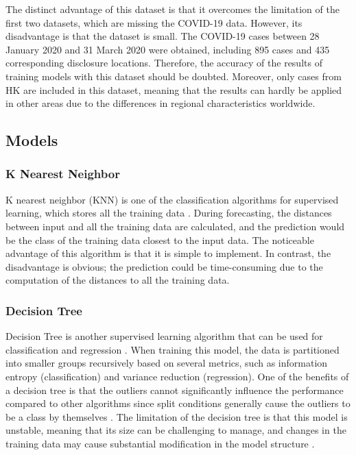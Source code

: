 \documentclass[12pt,twoside]{report}
\begin{document}
The distinct advantage of this dataset is that it overcomes the limitation of the first two datasets, which are missing the COVID-19 data. However, its disadvantage is that the dataset is small. The COVID-19 cases between 28 January 2020 and 31 March 2020 were obtained, including 895 cases and 435 corresponding disclosure locations. Therefore, the accuracy of the results of training models with this dataset should be doubted. Moreover, only cases from HK are included in this dataset, meaning that the results can hardly be applied in other areas due to the differences in regional characteristics worldwide. 

\subsection{Models}
\label{model_review}
\subsubsection{K Nearest Neighbor}
K nearest neighbor (KNN) is one of the classification algorithms for supervised learning, which stores all the training data \citep{RN33}. During forecasting, the distances between input and all the training data are calculated, and the prediction would be the class of the training data closest to the input data. The noticeable advantage of this algorithm is that it is simple to implement. In contrast, the disadvantage is obvious; the prediction could be time-consuming due to the computation of the distances to all the training data. 

\subsubsection{Decision Tree}
Decision Tree is another supervised learning algorithm that can be used for classification and regression \citep{RN33}. When training this model,  the data is partitioned into smaller groups recursively based on several metrics, such as information entropy (classification) and variance reduction (regression). One of the benefits of a decision tree is that the outliers cannot significantly influence the performance compared to other algorithms since split conditions generally cause the outliers to be a class by themselves \citep{RN31}. The limitation of the decision tree is that this model is unstable, meaning that its size can be challenging to manage, and changes in the training data may cause substantial modification in the model structure \citep{RN33}. 
\\
\end{document}
